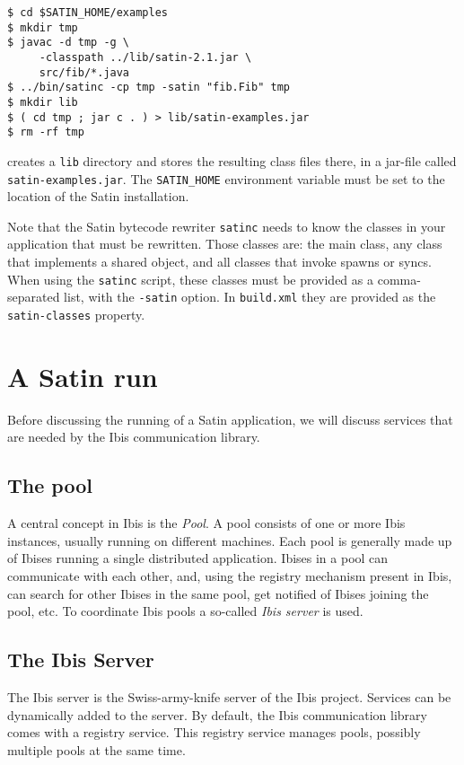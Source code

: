 \documentclass[a4paper,10pt]{article}
\begin{document}
\begin{verbatim}
$ cd $SATIN_HOME/examples
$ mkdir tmp
$ javac -d tmp -g \
     -classpath ../lib/satin-2.1.jar \
     src/fib/*.java
$ ../bin/satinc -cp tmp -satin "fib.Fib" tmp
$ mkdir lib
$ ( cd tmp ; jar c . ) > lib/satin-examples.jar
$ rm -rf tmp
\end{verbatim}

creates a \texttt{lib} directory and stores the resulting class files there,
in a jar-file called \texttt{satin-examples.jar}.
The \texttt{SATIN\_HOME} environment variable must be set to the location of
the Satin installation.

Note that the Satin bytecode rewriter \texttt{satinc} needs to know the
classes in your application that must be rewritten.
Those classes are: the main class, any class that implements a shared object,
and all classes that invoke spawns or syncs.
When using the \texttt{satinc} script, these classes must be provided as
a comma-separated list, with the \texttt{-satin} option. In
\texttt{build.xml} they are provided as the \texttt{satin-classes} property.

\section{A Satin run}

Before discussing
the running of a Satin application, we will discuss services that are
needed by the Ibis communication library.

\subsection{The pool}

A central concept in Ibis is the \emph{Pool}. A pool consists of one or
more Ibis instances, usually running on different machines. Each pool is
generally made up of Ibises running a single distributed application.
Ibises in a pool can communicate with each other, and, using the
registry mechanism present in Ibis, can search for other Ibises in the
same pool, get notified of Ibises joining the pool, etc. To
coordinate Ibis pools a so-called \emph{Ibis server} is used.

\subsection{The Ibis Server}

The Ibis server is the Swiss-army-knife server of the Ibis project.
Services can be dynamically added to the server. By default, the Ibis
communication library comes with a registry service. This registry
service manages pools, possibly multiple pools at the same time.
\end{document}
